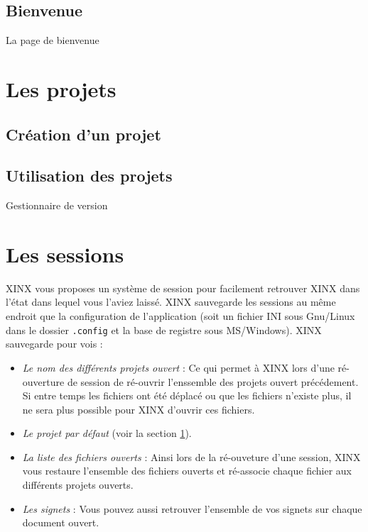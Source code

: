 \documentclass[a4paper,10pt,twoside]{book}
\begin{document}
\subsection{Bienvenue}
\label{sub:bienvenue}

La page de bienvenue

\section{Les projets}
\label{sec:Projets}

\subsection{Création d'un projet}

\subsection{Utilisation des projets}
\label{sec:RCS}
Gestionnaire de version

\section{Les sessions}
\label{sec:Sessions}

XINX vous proposes un système de session pour facilement retrouver XINX dans l'état dans lequel vous l'aviez laissé. XINX sauvegarde les sessions au même endroit que la configuration de l'application (soit un fichier INI sous Gnu/Linux dans le dossier \verb+.config+ et la base de registre sous MS/Windows). XINX sauvegarde pour vois :
\begin{itemize}
 \item \emph{Le nom des différents projets ouvert} : Ce qui permet à XINX lors d'une ré-ouverture de session de ré-ouvrir l'enssemble des projets ouvert précédement. Si entre temps les fichiers ont été déplacé ou que les fichiers n'existe plus, il ne sera plus possible pour XINX d'ouvrir ces fichiers.
 \item \emph{Le projet par défaut} (voir la section \ref{sec:Projets}).
 \item \emph{La liste des fichiers ouverts} : Ainsi lors de la ré-ouveture d'une session, XINX vous restaure l'ensemble des fichiers ouverts et ré-associe chaque fichier aux différents projets ouverts.
 \item \emph{Les signets} : Vous pouvez aussi retrouver l'ensemble de vos signets sur chaque document ouvert.
\end{itemize}
\end{document}
